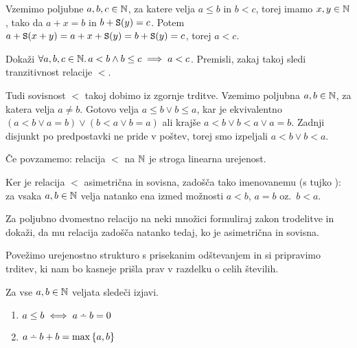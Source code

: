 Vzemimo poljubne $a, b, c \in \mathbb{N}$, za katere velja $a \leq b$ in $b < c$, torej imamo $x, y \in \mathbb{N}$, tako da $a + x = b$ in $b + \mathtt{S}(y) = c$. Potem $a + \mathtt{S}(x + y) = a + x + \mathtt{S}(y) = b + \mathtt{S}(y) = c$, torej $a < c$.

\begin{naloga}
Dokaži $\forall a, b, c \in \mathbb{N} .\,{a < b \land b \leq c \implies a < c}$. Premisli, zakaj takoj sledi tranzitivnost relacije $<$.
\end{naloga}

Tudi sovisnost $<$ takoj dobimo iz zgornje trditve. Vzemimo poljubna $a, b \in \mathbb{N}$, za katera velja $a \neq b$. Gotovo velja $a \leq b \lor b \leq a$, kar je ekvivalentno $(a < b \lor a = b) \lor (b < a \lor b = a)$ ali krajše $a < b \lor b < a \lor a = b$. Zadnji disjunkt po predpostavki ne pride v poštev, torej smo izpeljali $a < b \lor b < a$.

Če povzamemo: relacija $<$ na $\mathbb{N}$ je stroga linearna urejenost.

Ker je relacija $<$ asimetrična in sovisna, zadošča tako imenovanemu  (s tujko ): za vsaka $a, b \in \mathbb{N}$ velja natanko ena izmed možnosti $a < b$, $a = b$ oz.~$b < a$.

\begin{naloga}
Za poljubno dvomestno relacijo na neki množici formuliraj zakon trodelitve in dokaži, da mu relacija zadošča natanko tedaj, ko je asimetrična in sovisna.
\end{naloga}


Povežimo urejenostno strukturo s prisekanim odštevanjem in si pripravimo trditev, ki nam bo kasneje prišla prav v razdelku o celih številih.

\begin{trditev}\label{trditev:monus-in-urejenost}
Za vse $a, b \in \mathbb{N}$ veljata sledeči izjavi.
\begin{enumerate}
\item\label{trditev:monus-in-urejenost:neenakost}
$a \leq b \iff a \monus b = 0$
\item\label{trditev:monus-in-urejenost:maksimum}
$a \monus b + b = \max\set{a, b}$
\end{enumerate}
\end{trditev}

